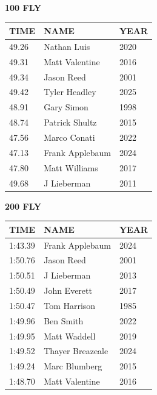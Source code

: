 \begin{table}[H]
\centering
\begin{minipage}[t]{0.48\textwidth}
\centering
\textbf{100 FLY}\\[0.1cm]
\begin{tabular}{@{}p{1.8cm}p{2.8cm}p{1.2cm}@{}}
\hline
    \textbf{TIME} & \textbf{NAME} & \textbf{YEAR} \\
\hline
    49.26 & Nathan Luis & 2020 \\
    49.31 & Matt Valentine & 2016 \\
    49.34 & Jason Reed & 2001 \\
    49.42 & Tyler Headley & 2025 \\
    48.91 & Gary Simon & 1998 \\
    48.74 & Patrick Shultz & 2015 \\
    47.56 & Marco Conati & 2022 \\
    47.13 & Frank Applebaum & 2024 \\
    47.80 & Matt Williams & 2017 \\
    49.68 & J Lieberman & 2011 \\
\hline
\end{tabular}
\end{minipage}\hfill
\begin{minipage}[t]{0.48\textwidth}
\centering
\textbf{200 FLY}\\[0.1cm]
\begin{tabular}{@{}p{1.8cm}p{2.8cm}p{1.2cm}@{}}
\hline
    \textbf{TIME} & \textbf{NAME} & \textbf{YEAR} \\
\hline
    1:43.39 & Frank Applebaum & 2024 \\
    1:50.76 & Jason Reed & 2001 \\
    1:50.51 & J Lieberman & 2013 \\
    1:50.49 & John Everett & 2017 \\
    1:50.47 & Tom Harrison & 1985 \\
    1:49.96 & Ben Smith & 2022 \\
    1:49.95 & Matt Waddell & 2019 \\
    1:49.52 & Thayer Breazeale & 2024 \\
    1:49.24 & Marc Blumberg & 2015 \\
    1:48.70 & Matt Valentine & 2016 \\
\hline
\end{tabular}
\end{minipage}
\end{table}

